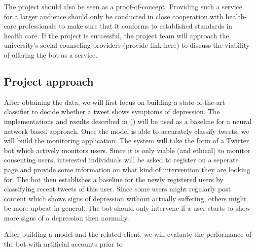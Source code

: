 \documentclass[colorback,accentcolor=tud9c]{tudreport}
\begin{document}
The project should also be seen as a proof-of-concept. Providing such a service for a larger audience should only be conducted in close cooperation with health-care professionals to make sure that it conforms to established standards in health care. If the project is successful, the project team will approach the university's social counseling providers (provide link here) to discuss the viability of offering the bot as a service.

\subsection*{Project approach}

After obtaining the data, we will first focus on building a state-of-the-art classifier to decide whether a tweet shows symptoms of depression. The implementations and results described in (\cite{nadeem_identifying_2016,coppersmith2015clpsych,jamil_monitoring_2017}) will be used as a baseline for a neural network based approach. Once the model is able to accurately classify tweets, we will build the monitoring application. The system will take the form of a Twitter bot which actively monitors users. Since it is only viable (and ethical) to monitor consenting users, interested individuals will be asked to register on a seperate page and provide some information on what kind of intervention they are looking for. The bot then establishes a baseline for the newly registered users by classifying recent tweets of this user. Since some users might regularly post content which shows signs of depression without actually suffering, others might be more upbeat in general. The bot should only intervene if a user starts to show more signs of a depression then normally.

After building a model and the related client, we will evaluate the performance of the bot with artificial accounts prior to 

%
\printbibliography 
\end{document}
